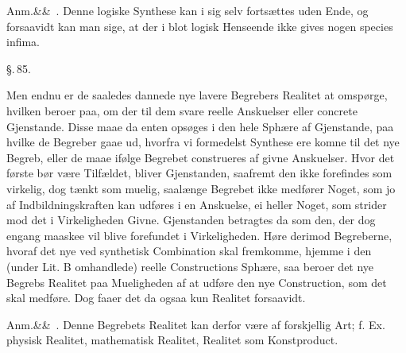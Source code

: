 \documentclass[12pt]{book}
\def\sperr#1{#1}%
\def\textit#1{#1}%
\newcommand{\sperr}[1]{\textls[180]{#1}}
\newcommand{\parag}[1]{%
  \par\vspace{0.9\baselineskip}%
  {\centering\textit{\S.\,#1.}\par}%
  \vspace{0.35\baselineskip}%
  \noindent\hspace{\parindent}\ignorespaces
}
\newcommand{\anm}[1]{%
  \par\vspace{0.5\baselineskip}%
  \noindent\hspace{\parindent}\sperr{Anm.}\ifx&#1&\else~\textit{#1}.\fi
  \enspace\ignorespaces
}
\newcommand{\opage}[1]{\marginnote{\footnotesize\textit{[#1]}}}
\begin{document}
\anm{} Denne logiske Synthese kan i sig selv fortsættes uden Ende, og forsaavidt kan man
sige, at der i blot logisk Henseende ikke gives nogen \textit{species infima}.

\parag{85}

Men endnu er de saaledes dannede nye lavere Begrebers Realitet at omspørge, hvilken
beroer paa, om der til dem svare reelle Anskuelser eller concrete Gjenstande. Disse maae
da enten opsøges i den hele Sphære af Gjenstande, paa hvilke de Begreber gaae ud,
hvorfra vi formedelst Synthese ere komne til det nye Begreb, eller de maae ifølge
Begrebet construeres af givne Anskuelser. Hvor det første bør være Tilfældet, bliver
Gjenstanden, saafremt den ikke forefindes som virkelig, dog tænkt som muelig, saalænge
Begrebet ikke medfører Noget, som jo af Indbildningskraften kan udføres i en Anskuelse,
ei heller Noget, som strider mod det i Virkeligheden Givne. Gjenstanden betragtes da
\opage{228} som den, der dog engang maaskee vil blive forefundet i Virkeligheden. Høre derimod
Begreberne, hvoraf det nye ved synthetisk Combination skal fremkomme, hjemme i den
(under Lit. \textit{B} omhandlede) reelle Constructions Sphære, saa beroer det nye
Begrebs Realitet paa Mueligheden af at udføre den nye Construction, som det skal
medføre. Dog faaer det da ogsaa kun Realitet forsaavidt.

\anm{} Denne Begrebets Realitet kan derfor være af forskjellig Art; f. Ex. physisk
Realitet, mathematisk Realitet, Realitet som Konstproduct.
\end{document}
